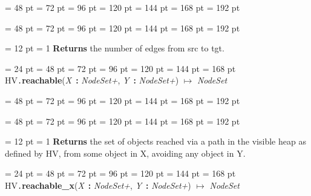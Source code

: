 {{{{\par \noindent  \leftskip = 48 pt  \leftmargini = 72 pt  \leftmarginii = 96 pt  \leftmarginiii = 120 pt  \leftmarginiv = 144 pt  \leftmarginv = 168 pt  \leftmarginvi = 192 pt {\par \noindent
\par}
\par}
{\par \noindent  \leftskip = 48 pt  \leftmargini = 72 pt  \leftmarginii = 96 pt  \leftmarginiii = 120 pt  \leftmarginiv = 144 pt  \leftmarginv = 168 pt  \leftmarginvi = 192 pt {\par \noindent
{\par \pagebreak[3.100000] \noindent \hangindent = 12 pt \hangafter = 1 
{\bf Returns \/} the number of edges from src to tgt.
\par}
\par}
\par}
\par}
\par}
{\par \noindent  \leftskip = 24 pt  \leftmargini = 48 pt  \leftmarginii = 72 pt  \leftmarginiii = 96 pt  \leftmarginiv = 120 pt  \leftmarginv = 144 pt  \leftmarginvi = 168 pt HV{\tt .\/}{\bf {\large {\bf reachable\/}}\/}({\em X\/}~{\bf :}  {\em NodeSet+\/}, {\em Y\/}~{\bf :}  {\em NodeSet+\/}) \(\mapsto \)  {\em NodeSet\/}{\par \noindent
{\par \noindent  \leftskip = 48 pt  \leftmargini = 72 pt  \leftmarginii = 96 pt  \leftmarginiii = 120 pt  \leftmarginiv = 144 pt  \leftmarginv = 168 pt  \leftmarginvi = 192 pt {\par \noindent
\par}
\par}
{\par \noindent  \leftskip = 48 pt  \leftmargini = 72 pt  \leftmarginii = 96 pt  \leftmarginiii = 120 pt  \leftmarginiv = 144 pt  \leftmarginv = 168 pt  \leftmarginvi = 192 pt {\par \noindent
{\par \pagebreak[3.100000] \noindent \hangindent = 12 pt \hangafter = 1 
{\bf Returns \/} the set of objects reached via a path in the visible heap as
defined by HV, from some object in X, avoiding any object in Y.
\par}
\par}
\par}
\par}
\par}
{\par \noindent  \leftskip = 24 pt  \leftmargini = 48 pt  \leftmarginii = 72 pt  \leftmarginiii = 96 pt  \leftmarginiv = 120 pt  \leftmarginv = 144 pt  \leftmarginvi = 168 pt HV{\tt .\/}{\bf {\large {\bf reachable{\_}x\/}}\/}({\em X\/}~{\bf :}  {\em NodeSet+\/}, {\em Y\/}~{\bf :}  {\em NodeSet+\/}) \(\mapsto \)  {\em NodeSet\/}{\par \noindent
}}}
